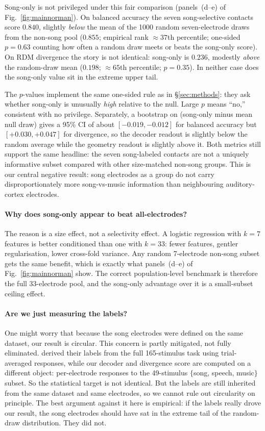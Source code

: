 \documentclass[11pt]{article}
\begin{document}
Song-only is not privileged under this fair comparison (panels~(d--e) of Fig.~\ref{fig:mainnorman}). On balanced accuracy the seven song-selective contacts score $0.840$, slightly \emph{below} the mean of the 1000 random seven-electrode draws from the non-song pool ($0.855$; empirical rank $\approx 37$th percentile; one-sided $p = 0.63$ counting how often a random draw meets or beats the song-only score). On RDM divergence the story is not identical: song-only is $0.236$, modestly \emph{above} the random-draw mean ($0.198$; $\approx 65$th percentile; $p = 0.35$). In neither case does the song-only value sit in the extreme upper tail.

The $p$-values implement the same one-sided rule as in \S\ref{sec:methods}: they ask whether song-only is unusually \emph{high} relative to the null. Large $p$ means ``no,'' consistent with no privilege. Separately, a bootstrap on (song-only minus mean null draw) gives a 95\% CI of about $[-0.019,-0.012]$ for balanced accuracy but $[+0.030,+0.047]$ for divergence, so the decoder readout is slightly below the random average while the geometry readout is slightly above it. Both metrics still support the same headline: the seven song-labeled contacts are not a uniquely informative subset compared with other size-matched non-song groups. This is our central negative result: song electrodes as a group do not carry disproportionately more song-vs-music information than neighbouring auditory-cortex electrodes.

\paragraph{Why does song-only appear to beat all-electrodes?} The reason is a size effect, not a selectivity effect. A logistic regression with $k = 7$ features is better conditioned than one with $k = 33$: fewer features, gentler regularisation, lower cross-fold variance. Any random 7-electrode non-song subset gets the same benefit, which is exactly what panels~(d--e) of Fig.~\ref{fig:mainnorman} show. The correct population-level benchmark is therefore the full 33-electrode pool, and the song-only advantage over it is a small-subset ceiling effect.

\paragraph{Are we just measuring the labels?} One might worry that because the song electrodes were defined on the same dataset, our result is circular. This concern is partly mitigated, not fully eliminated. \citet{NormanHaignere2022} derived their labels from the full 165-stimulus task using trial-averaged responses, while our decoder and divergence score are computed on a different object: per-electrode responses to the 49-stimulus $\{$song, speech, music$\}$ subset. So the statistical target is not identical. But the labels are still inherited from the same dataset and same electrodes, so we cannot rule out circularity on principle. The best argument against it here is empirical: if the labels really drove our result, the song electrodes should have sat in the extreme tail of the random-draw distribution. They did not.
\end{document}
